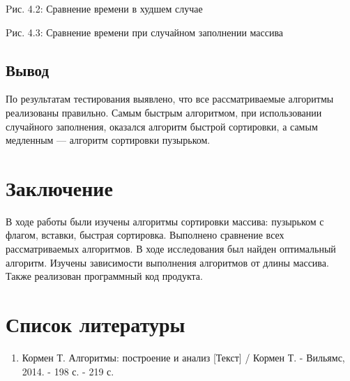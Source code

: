 \documentclass[12pt]{report}
\begin{document}
\begin{center}
Pис. 4.2: Сравнение времени в худшем случае
\end{center}


\begin{center}
Pис. 4.3: Сравнение времени при случайном заполнении массива
\end{center}

\section{Вывод}
По результатам тестирования выявлено, что все рассматриваемые алгоритмы реализованы правильно. Самым быстрым алгоритмом, при использовании случайного заполнения, оказался алгоритм быстрой сортировки, а самым медленным — алгоритм сортировки пузырьком.

\chapter*{Заключение}
В ходе работы были изучены алгоритмы сортировки массива: пузырьком с флагом, вставки, быстрая сортировка. Выполнено сравнение всех рассматриваемых алгоритмов. В ходе исследования был найден оптимальный алгоритм. Изучены зависимости выполнения алгоритмов от длины массива. Также реализован программный код продукта.


\chapter*{Список литературы}
\begin{enumerate}
	\item Кормен Т. Алгоритмы: построение и анализ [Текст] / Кормен Т. - Вильямс, 2014. - 198 с. - 219 с.
\end{enumerate}
\end{document}
